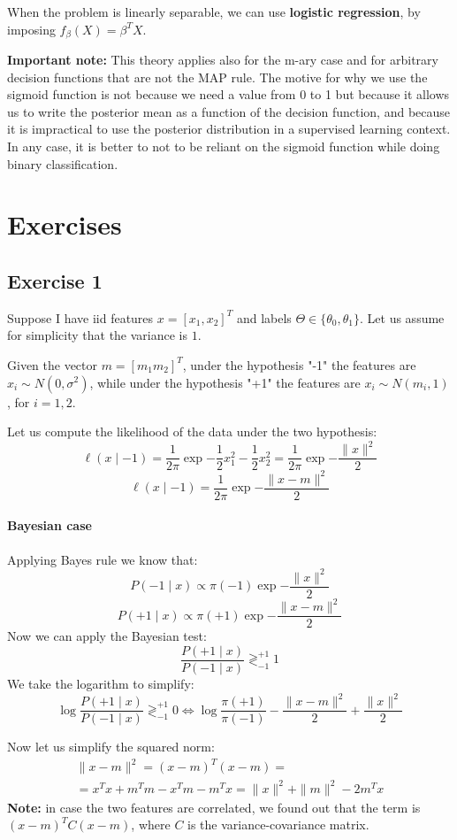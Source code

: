 When the problem is linearly separable, we can use \textbf{logistic regression}, by imposing $f_\beta(X) = \beta^T X$.

\textbf{Important note:} This theory applies also for the m-ary case and for arbitrary decision functions that are not the MAP rule. The motive for why we use the sigmoid function is not because we need a value from 0 to 1 but because it allows us to write the posterior mean as a function of the decision function, and because it is impractical to use the posterior distribution in a supervised learning context. In any case, it is better to not to be reliant on the sigmoid function while doing binary classification.

\section{Exercises}
\subsection{Exercise 1}
Suppose I have iid features $x = [x_1, x_2]^T$ and labels $\Theta \in \{\theta_0, \theta_1\}$. Let us assume for simplicity that the variance is $1$.

Given the vector $m = [m_1 m_2]^T$, under the hypothesis "-1" the features are $x_i \sim N(0, \sigma^2)$, while under the hypothesis "+1" the features are $x_i \sim N(m_i, 1)$, for $i=1,2$.

Let us compute the likelihood of the data under the two hypothesis:
\[
    \ell(x \mid -1 ) = \frac{1}{2\pi} \exp{-\frac{1}{2} x_1^2 - \frac{1}{2} x_2^2 } = \frac{1}{2\pi} \exp{- \frac{\|x\|^2}{2}}
\]
\[
    \ell(x \mid -1 ) = \frac{1}{2\pi} \exp{- \frac{\|x-m\|^2}{2}}
\]
\paragraph*{Bayesian case}
Applying Bayes rule we know that:
\[
    P(-1 \mid x) \propto \pi(-1) \exp{- \frac{\|x\|^2}{2}}
\]
\[
    P(+1 \mid x) \propto \pi(+1) \exp{- \frac{\|x-m\|^2}{2}}
\]
Now we can apply the Bayesian test:
\[
    \frac{P(+1 \mid x)}{P(-1 \mid x)} \gtrless^{+1}_{-1} 1
\]
We take the logarithm to simplify:
\[
    \log \frac{P(+1 \mid x)}{P(-1 \mid x)} \gtrless^{+1}_{-1} 0 \Leftrightarrow \log\frac{\pi(+1)}{\pi(-1)} -  \frac{\|x-m\|^2}{2} + \frac{\|x\|^2}{2}
\]

Now let us simplify the squared norm:
\begin{align*}
    \|x-m\|^2 = (x-m)^T (x-m) = \\
    = x^T x + m^T m - x^T m - m^T x = \|x\|^2 + \|m\|^2 - 2m^T x
\end{align*}
\textbf{Note:} in case the two features are correlated, we found out that the term is $(x-m)^T C (x-m)$, where $C$ is the variance-covariance matrix.

